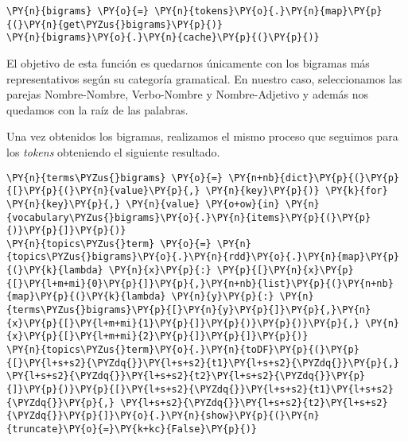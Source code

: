 \begin{tcolorbox}[breakable, size=fbox, boxrule=1pt, pad at break*=1mm,colback=cellbackground, colframe=cellborder]
\begin{Verbatim}[commandchars=\\\{\}]
\PY{n}{bigrams} \PY{o}{=} \PY{n}{tokens}\PY{o}{.}\PY{n}{map}\PY{p}{(}\PY{n}{get\PYZus{}bigrams}\PY{p}{)}	
\PY{n}{bigrams}\PY{o}{.}\PY{n}{cache}\PY{p}{(}\PY{p}{)}
\end{Verbatim}
\end{tcolorbox}


El objetivo de esta función es quedarnos únicamente con los bigramas más representativos según su categoría gramatical. En nuestro caso, seleccionamos las parejas Nombre-Nombre, Verbo-Nombre y Nombre-Adjetivo y además nos quedamos con la raíz de las palabras.
          
Una vez obtenidos los bigramas, realizamos el mismo proceso que seguimos para los \textit{tokens} obteniendo el siguiente resultado.

\vspace{0.5cm}
   \begin{tcolorbox}[breakable, size=fbox, boxrule=1pt, pad at break*=1mm,colback=cellbackground, colframe=cellborder]
\begin{Verbatim}[commandchars=\\\{\}]
\PY{n}{terms\PYZus{}bigrams} \PY{o}{=} \PY{n+nb}{dict}\PY{p}{(}\PY{p}{[}\PY{p}{(}\PY{n}{value}\PY{p}{,} \PY{n}{key}\PY{p}{)} \PY{k}{for} \PY{n}{key}\PY{p}{,} \PY{n}{value} \PY{o+ow}{in} \PY{n}{vocabulary\PYZus{}bigrams}\PY{o}{.}\PY{n}{items}\PY{p}{(}\PY{p}{)}\PY{p}{]}\PY{p}{)}
\PY{n}{topics\PYZus{}term} \PY{o}{=} \PY{n}{topics\PYZus{}bigrams}\PY{o}{.}\PY{n}{rdd}\PY{o}{.}\PY{n}{map}\PY{p}{(}\PY{k}{lambda} \PY{n}{x}\PY{p}{:} \PY{p}{[}\PY{n}{x}\PY{p}{[}\PY{l+m+mi}{0}\PY{p}{]}\PY{p}{,}\PY{n+nb}{list}\PY{p}{(}\PY{n+nb}{map}\PY{p}{(}\PY{k}{lambda} \PY{n}{y}\PY{p}{:} \PY{n}{terms\PYZus{}bigrams}\PY{p}{[}\PY{n}{y}\PY{p}{]}\PY{p}{,}\PY{n}{x}\PY{p}{[}\PY{l+m+mi}{1}\PY{p}{]}\PY{p}{)}\PY{p}{)}\PY{p}{,} \PY{n}{x}\PY{p}{[}\PY{l+m+mi}{2}\PY{p}{]}\PY{p}{]}\PY{p}{)}
\PY{n}{topics\PYZus{}term}\PY{o}{.}\PY{n}{toDF}\PY{p}{(}\PY{p}{[}\PY{l+s+s2}{\PYZdq{}}\PY{l+s+s2}{t1}\PY{l+s+s2}{\PYZdq{}}\PY{p}{,} \PY{l+s+s2}{\PYZdq{}}\PY{l+s+s2}{t2}\PY{l+s+s2}{\PYZdq{}}\PY{p}{]}\PY{p}{)}\PY{p}{[}\PY{l+s+s2}{\PYZdq{}}\PY{l+s+s2}{t1}\PY{l+s+s2}{\PYZdq{}}\PY{p}{,} \PY{l+s+s2}{\PYZdq{}}\PY{l+s+s2}{t2}\PY{l+s+s2}{\PYZdq{}}\PY{p}{]}\PY{o}{.}\PY{n}{show}\PY{p}{(}\PY{n}{truncate}\PY{o}{=}\PY{k+kc}{False}\PY{p}{)}
\end{Verbatim}
\end{tcolorbox}

